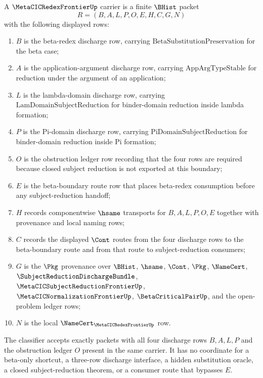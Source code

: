 \begin{definition}
\label{def:metacic-redex-frontier-carrier}
A $\MetaCICRedexFrontierUp$ carrier is a finite $\BHist$ packet
$$
R=(B,A,L,P,O,E,H,C,G,N)
$$
with the following displayed rows:
\begin{enumerate}
\item $B$ is the beta-redex discharge row, carrying $\mathrm{BetaSubstitutionPreservation}$ for the beta case;
\item $A$ is the application-argument discharge row, carrying $\mathrm{AppArgTypeStable}$ for reduction under the argument of an application;
\item $L$ is the lambda-domain discharge row, carrying $\mathrm{LamDomainSubjectReduction}$ for binder-domain reduction inside lambda formation;
\item $P$ is the Pi-domain discharge row, carrying $\mathrm{PiDomainSubjectReduction}$ for binder-domain reduction inside Pi formation;
\item $O$ is the obstruction ledger row recording that the four rows are required because closed subject reduction is not exported at this boundary;
\item $E$ is the beta-boundary route row that places beta-redex consumption before any subject-reduction handoff;
\item $H$ records componentwise $\hsame$ transports for $B,A,L,P,O,E$ together with provenance and local naming rows;
\item $C$ records the displayed $\Cont$ routes from the four discharge rows to the beta-boundary route and from that route to subject-reduction consumers;
\item $G$ is the $\Pkg$ provenance over $\BHist$, $\hsame$, $\Cont$, $\Pkg$, $\NameCert$, $\SubjectReductionDischargeBundle$, $\MetaCICSubjectReductionFrontierUp$, $\MetaCICNormalizationFrontierUp$, $\BetaCriticalPairUp$, and the open-problem ledger rows;
\item $N$ is the local $\NameCert_{\MetaCICRedexFrontierUp}$ row.
\end{enumerate}
The classifier accepts exactly packets with all four discharge rows
$B,A,L,P$ and the obstruction ledger $O$ present in the same carrier. It has no
coordinate for a beta-only shortcut, a three-row discharge interface, a hidden
substitution oracle, a closed subject-reduction theorem, or a consumer route
that bypasses $E$.
\end{definition}


